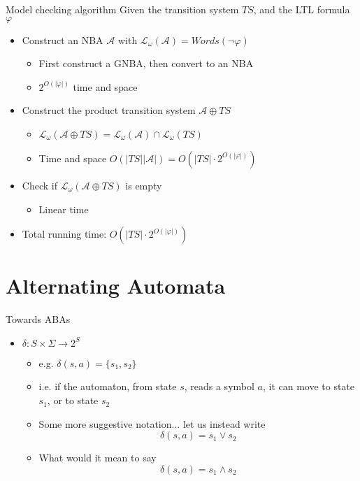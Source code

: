 \documentclass{beamer}
\begin{document}
\begin{frame}{Model checking algorithm}
Given the transition system $TS$, and the LTL formula $\varphi$
\begin{itemize}
\item Construct an NBA $\mathcal{A}$ with $\mathcal{L}_\omega(\mathcal{A}) = Words(\neg \varphi)$
    \begin{itemize}
    \item First construct a GNBA, then convert to an NBA
    \item $2^{O(|\varphi|)}$ time and space
    \end{itemize}
\pause
\item Construct the product transition system $\mathcal{A} \oplus TS$
    \begin{itemize}
    \item $\mathcal{L}_\omega(\mathcal{A} \oplus TS) = \mathcal{L}_\omega(\mathcal{A}) \cap \mathcal{L}_\omega(TS)$
    \item Time and space $O(|TS||\mathcal{A}|) = O(|TS|\cdot2^{O(|\varphi|)})$
    \end{itemize}
\pause
\item Check if $\mathcal{L}_\omega(\mathcal{A} \oplus TS)$ is empty
    \begin{itemize}
    \item Linear time
    \end{itemize}
\pause
\item Total running time: $O(|TS|\cdot2^{O(|\varphi|)})$
\end{itemize}
\end{frame}
 
\section{Alternating Automata}
\begin{frame}{Towards ABAs}
\begin{itemize}
\item $\delta: S \times \Sigma \rightarrow 2^S$
\begin{itemize}
    \item e.g. $\delta(s, a) = \{s_1, s_2\}$
    \item i.e. if the automaton, from state $s$, reads a symbol $a$, it
    can move to state $s_1$, or to state $s_2$
\pause
    \item Some more suggestive notation... let us instead write
    $$ \delta(s, a) = s_1 \vee s_2 $$
\pause
    \item What would it mean to say
    $$ \delta(s, a) = s_1 \wedge s_2 $$
\end{itemize}
\end{itemize}
\end{frame}
\end{document}

